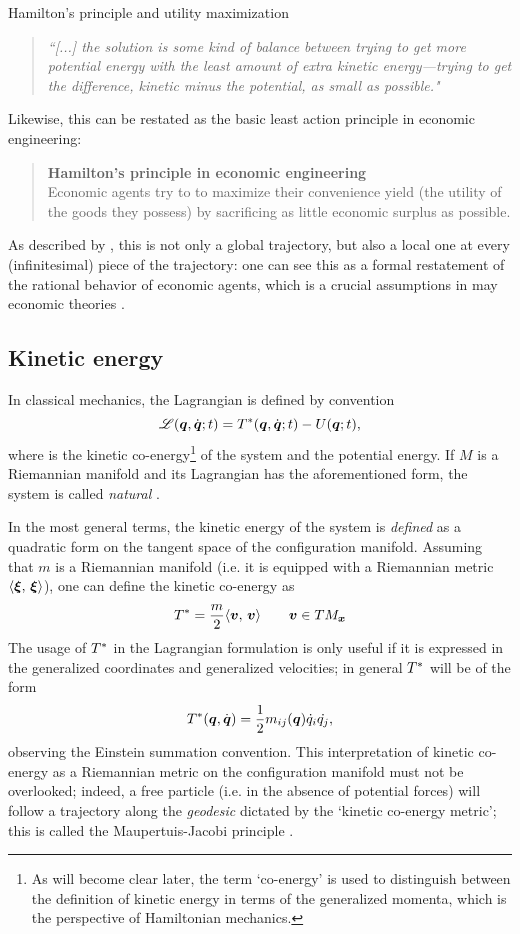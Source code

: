 \begin{econ}{Hamilton's principle and utility maximization}
    \begin{quote}
        \emph{``[...] the solution is some kind of balance between trying to get more potential energy with the least amount of extra kinetic energy—trying to get the difference, kinetic minus the potential, as small as possible."}
    \end{quote}
    Likewise, this can be restated as the basic least action principle in economic engineering:
    \begin{quote}
        \textbf{Hamilton's principle in economic engineering}\\ Economic agents try to to maximize their convenience yield (the utility of the goods they possess) by sacrificing as little  economic surplus as possible.
    \end{quote}
    As described by \citet{Feynman2010}, this is not only a global trajectory, but also a local one at every (infinitesimal) piece of the trajectory: one can see this as a formal restatement of the rational behavior of economic agents, which is a crucial assumptions in may economic theories \cite{Mankiw2017}.
\end{econ}

\subsection{Kinetic energy}
In classical mechanics, the Lagrangian is defined by convention
\[\mathscr{L}(\vb*{q},\dot{\vb*{q}}; t) = T^*(\vb*{q},\dot{\vb*{q}}; t) - U(\vb*{q}; t),\] 
where \ecokin is the kinetic co-energy\footnote{As will become clear later, the term `co-energy' is used to distinguish between the definition of kinetic energy in terms of the generalized momenta, which is the perspective of Hamiltonian mechanics.} of the system and \epot the potential energy. If \(M\) is a Riemannian manifold and its Lagrangian has the aforementioned form, the system is called \emph{natural} \cite{Arnold1989}.

In the most general terms, the kinetic energy of the system is \emph{defined} as a quadratic form on the tangent space of the configuration manifold. Assuming that $m$ is a Riemannian manifold (i.e. it is equipped with a Riemannian metric $\langle \vb*{\xi},\, \vb*{\xi}\rangle$), one can define the kinetic co-energy as
\begin{equation}
    T^* = \frac{m}{2}\langle \vb*{v},\, \vb*{v}\rangle\qquad \vb*{v} \in TM_{\vb*{x}}
    \label{eq:ekin_mfld}
\end{equation}
The usage of $T^*$ in the Lagrangian formulation is only useful if it is expressed in the generalized coordinates and generalized velocities; in general $T^*$ will be of the form
$$T^*(\vb*{q}, \dot{\vb*{q}}) = \frac{1}{2}m_{ij}(\vb*{q})\dot{q}_i\dot{q_j}, $$ 
observing the Einstein summation convention. This interpretation of kinetic co-energy as a Riemannian metric on the configuration manifold must not be overlooked; indeed, a free particle (i.e. in the absence of potential forces) will follow a trajectory along the \emph{geodesic} dictated by the `kinetic co-energy metric'; this is called the Maupertuis-Jacobi principle \cite{Arnold1989}.

